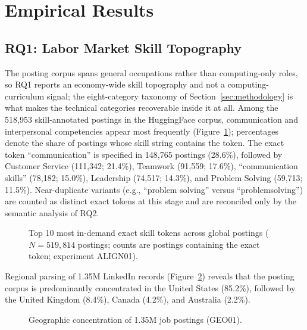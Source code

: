 \documentclass[journal]{IEEEtran}
\begin{document}
\section{Empirical Results}
\label{sec:results}

\subsection{RQ1: Labor Market Skill Topography}

The posting corpus spans general occupations rather than computing-only roles, so RQ1 reports an economy-wide skill topography and not a computing-curriculum signal; the eight-category taxonomy of Section~\ref{sec:methodology} is what makes the technical categories recoverable inside it at all. Among the 518,953 skill-annotated postings in the HuggingFace corpus, communication and interpersonal competencies appear most frequently (Figure~\ref{fig:top_skills}); percentages denote the share of postings whose skill string contains the token. The exact token ``communication'' is specified in 148,765 postings (28.6\%), followed by Customer Service (111,342; 21.4\%), Teamwork (91,559; 17.6\%), ``communication skills'' (78,182; 15.0\%), Leadership (74,517; 14.3\%), and Problem Solving (59,713; 11.5\%). Near-duplicate variants (e.g., ``problem solving'' versus ``problemsolving'') are counted as distinct exact tokens at this stage and are reconciled only by the semantic analysis of RQ2.

\begin{figure}[!htbp]
    \centering
    \FigTopSkills
    \caption{Top 10 most in-demand exact skill tokens across global postings ($N = 519{,}814$ postings; counts are postings containing the exact token; experiment ALIGN01).}
    \label{fig:top_skills}
\end{figure}

Regional parsing of 1.35M LinkedIn records (Figure~\ref{fig:geographic}) reveals that the posting corpus is predominantly concentrated in the United States (85.2\%), followed by the United Kingdom (8.4\%), Canada (4.2\%), and Australia (2.2\%).

\begin{figure}[!htbp]
    \centering
    \FigGeo
    \caption{Geographic concentration of 1.35M job postings (GEO01).}
    \label{fig:geographic}
\end{figure}
\end{document}
